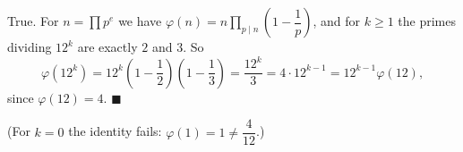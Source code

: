 True. For $n=\prod p^{e}$ we have $\varphi(n)=n\prod_{p\mid n}\left(1-\dfrac1p\right)$, and for $k\ge1$ the primes dividing $12^k$ are exactly $2$ and $3$. So
\[\varphi(12^k)=12^k\left(1-\dfrac12\right)\left(1-\dfrac13\right)=\dfrac{12^k}{3}=4\cdot12^{k-1}=12^{k-1}\varphi(12),\]
since $\varphi(12)=4$. $\blacksquare$

(For $k=0$ the identity fails: $\varphi(1)=1\ne\dfrac4{12}$.)

